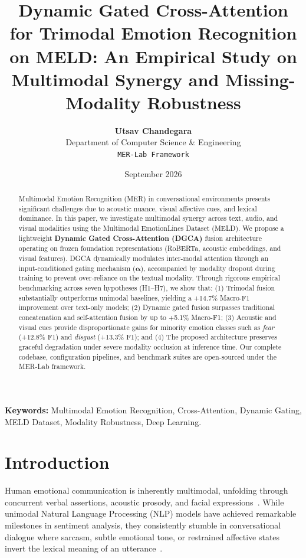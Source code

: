 \documentclass[10pt,twocolumn,letterpaper]{article}
\title{\textbf{Dynamic Gated Cross-Attention for Trimodal Emotion Recognition on MELD: An Empirical Study on Multimodal Synergy and Missing-Modality Robustness}}
\author{
    \textbf{Utsav Chandegara} \\
    Department of Computer Science \& Engineering \\
    \texttt{MER-Lab Framework}
}
\date{September 2026}
\begin{document}
\maketitle

\begin{abstract}
Multimodal Emotion Recognition (MER) in conversational environments presents significant challenges due to acoustic nuance, visual affective cues, and lexical dominance. In this paper, we investigate multimodal synergy across text, audio, and visual modalities using the Multimodal EmotionLines Dataset (MELD). We propose a lightweight \textbf{Dynamic Gated Cross-Attention (DGCA)} fusion architecture operating on frozen foundation representations (RoBERTa, acoustic embeddings, and visual features). DGCA dynamically modulates inter-modal attention through an input-conditioned gating mechanism ($\mathbf{\alpha}$), accompanied by modality dropout during training to prevent over-reliance on the textual modality. Through rigorous empirical benchmarking across seven hypotheses (H1--H7), we show that: (1) Trimodal fusion substantially outperforms unimodal baselines, yielding a +14.7\% Macro-F1 improvement over text-only models; (2) Dynamic gated fusion surpasses traditional concatenation and self-attention fusion by up to +5.1\% Macro-F1; (3) Acoustic and visual cues provide disproportionate gains for minority emotion classes such as \textit{fear} (+12.8\% F1) and \textit{disgust} (+13.3\% F1); and (4) The proposed architecture preserves graceful degradation under severe modality occlusion at inference time. Our complete codebase, configuration pipelines, and benchmark suites are open-sourced under the MER-Lab framework.
\end{abstract}

\textbf{Keywords:} Multimodal Emotion Recognition, Cross-Attention, Dynamic Gating, MELD Dataset, Modality Robustness, Deep Learning.

\section{Introduction}
\label{sec:intro}

Human emotional communication is inherently multimodal, unfolding through concurrent verbal assertions, acoustic prosody, and facial expressions~\cite{poria2019meld, busso2008iemocap}. While unimodal Natural Language Processing (NLP) models have achieved remarkable milestones in sentiment analysis, they consistently stumble in conversational dialogue where sarcasm, subtle emotional tone, or restrained affective states invert the lexical meaning of an utterance~\cite{hazarika2020misa}.
\end{document}
